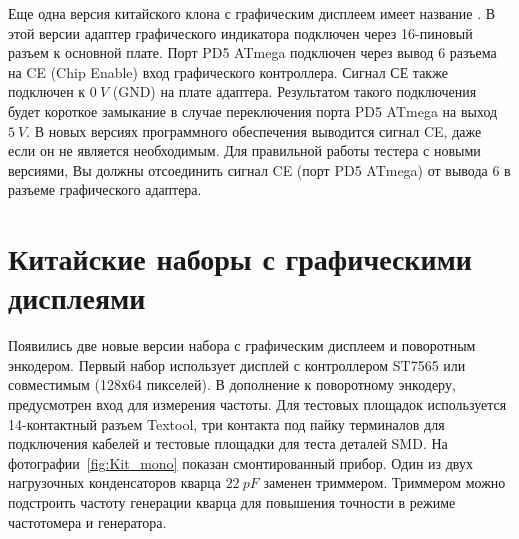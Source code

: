 Еще одна версия китайского клона с графическим дисплеем имеет название .
В этой версии адаптер графического индикатора подключен через 16-пиновый разъем к основной плате.
Порт PD5 ATmega подключен через вывод 6 разъема на CE (Chip Enable) вход 
графического контроллера.
Сигнал СЕ также подключен к \(0~V\) (GND) на плате адаптера.
Результатом такого подключения будет короткое замыкание в случае переключения порта PD5 ATmega на
выход \(5~V\).
В новых версиях программного обеспечения выводится сигнал CE, даже если он не является необходимым.
Для правильной работы  тестера с новыми версиями, Вы должны отсоединить сигнал CE (порт PD5 ATmega)
от вывода 6 в разъеме графического адаптера.
\section{Китайские наборы с графическими дисплеями}
Появились две новые версии набора с графическим дисплеем и поворотным энкодером.
Первый набор использует дисплей с контроллером ST7565 или совместимым (128х64 пикселей).
В дополнение к поворотному энкодеру, предусмотрен вход для измерения частоты.
Для тестовых площадок используется 14-контактный разъем Textool, три контакта под пайку
терминалов для подключения кабелей и тестовые площадки для теста деталей SMD.
На фотографии~\ref{fig:Kit_mono} показан смонтированный прибор.
Один из двух нагрузочных конденсаторов кварца \(22~pF\) заменен триммером.
Триммером можно подстроить частоту генерации кварца для повышения точности в режиме частотомера и генератора.
